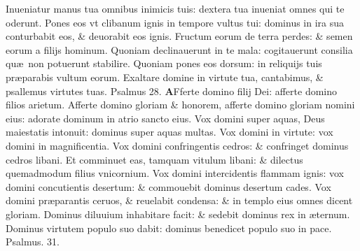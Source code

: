 \documentclass[a5paper,10pt]{book}
\def\ae{æ}
\begin{document}
\begin{multicols*}{2}
\newline \color{red} I\color{black}nueniatur manus tua omnibus inimicis tuis: dextera tua inueniat omnes qui te oderunt.
\newline \color{red} P\color{black}ones eos vt clibanum ignis in tempore vultus tui: dominus in ira sua conturbabit eos, \& deuorabit eos ignis.
\newline \color{red} F\color{black}ructum eorum de terra perdes: \& semen eorum a filijs hominum.
\newline \color{red} Q\color{black}uoniam declinauerunt in te mala: cogitauerunt consilia qu\ae \ non potuerunt stabilire.
\newline \color{red} Q\color{black}uoniam pones eos dorsum: in reliquijs tuis pr\ae parabis vultum eorum.
\newline \color{red} E\color{black}xaltare domine in virtute tua, cantabimus, \& psallemus virtutes tuas.
\newline \color{red} Psalmus 28. \color{black}
\vspace{-1em}
\lettrine[lines=2]{\bfseries \color{red} A}{}Fferte domino filij Dei: afferte domino filios arietum.
\newline \color{red} A\color{black}fferte domino gloriam \& honorem, afferte domino gloriam nomini eius: adorate dominum in atrio sancto eius.
\newline \color{red} V\color{black}ox domini super aquas, Deus maiestatis intonuit: dominus super aquas multas.
\newline \color{red} V\color{black}ox domini in virtute: vox domini in magnificentia.
\newline \color{red} V\color{black}ox domini confringentis cedros: \& confringet dominus cedros libani.
\newline \color{red} E\color{black}t comminuet eas, tamquam vitulum libani: \& dilectus quemadmodum filius vnicornium.
\newline \color{red} V\color{black}ox domini intercidentis flammam ignis: vox domini concutientis desertum: \& commouebit dominus desertum cades.
\newline \color{red} V\color{black}ox domini pr\ae parantis ceruos, \& reuelabit condensa: \& in templo eius omnes dicent gloriam.
\newline \color{red} D\color{black}ominus diluuium inhabitare facit: \& sedebit dominus rex in \ae ternum.
\newline \color{red} D\color{black}ominus virtutem populo suo dabit: dominus benedicet populo suo in pace.
\newline \color{red} Psalmus. 31. \color{black}

\end{multicols*}
\end{document}
